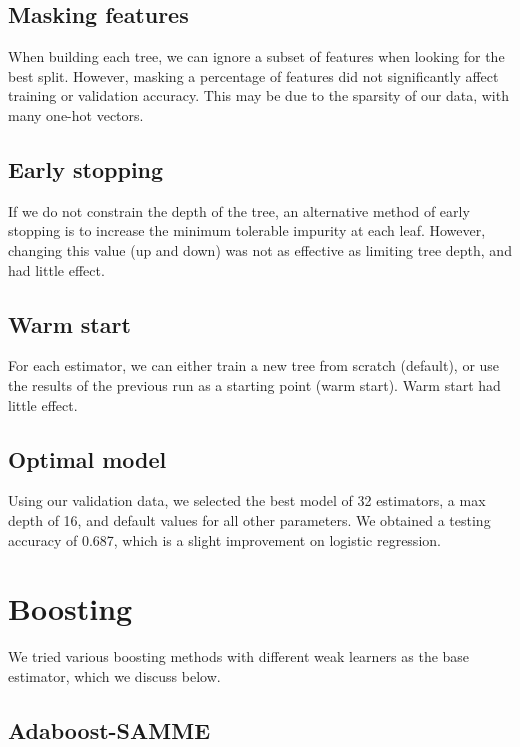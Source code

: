 \documentclass{article}
\begin{document}
\begin{multicols}{2}
\subsection{Masking features}

When building each tree,
we can ignore a subset of features
when looking for the best split.
However, masking a percentage of features
did not significantly affect training or
validation accuracy.
This may be due to the sparsity
of our data, with many one-hot vectors.

\subsection{Early stopping}

If we do not constrain the depth of the tree,
an alternative method of early stopping
is to increase the minimum tolerable impurity at each leaf.
However, changing this value (up and down)
was not as effective as
limiting tree depth, and had little effect.

\subsection{Warm start}

For each estimator,
we can either train a new tree from scratch (default),
or use the results of the previous run
as a starting point (warm start).
Warm start had little effect.

\subsection{Optimal model}

Using our validation data,
we selected the best model
of 32 estimators, a max depth of 16,
and default values for all other parameters.
We obtained a testing accuracy of 0.687,
which is a slight improvement on logistic regression.

\section{Boosting}

We tried various boosting methods
with different weak learners as the base estimator,
which we discuss below.

\subsection{Adaboost-SAMME}


\end{multicols}
\end{document}

